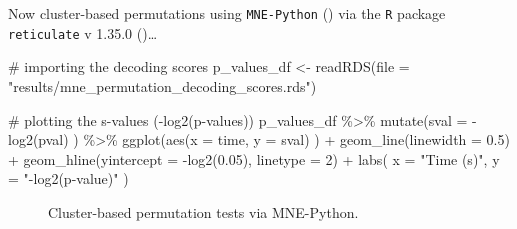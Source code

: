 \documentclass[
  doc,
  floatsintext,
  longtable,
  a4paper,
  nolmodern,
  notxfonts,
  notimes,
  colorlinks=true,linkcolor=blue,citecolor=blue,urlcolor=blue]{apa7}
\newenvironment{Shaded}{\begin{snugshade}}{\end{snugshade}}
\newcommand{\AttributeTok}[1]{\textcolor[rgb]{0.40,0.45,0.13}{#1}}
\newcommand{\CommentTok}[1]{\textcolor[rgb]{0.37,0.37,0.37}{#1}}
\newcommand{\DecValTok}[1]{\textcolor[rgb]{0.68,0.00,0.00}{#1}}
\newcommand{\FloatTok}[1]{\textcolor[rgb]{0.68,0.00,0.00}{#1}}
\newcommand{\FunctionTok}[1]{\textcolor[rgb]{0.28,0.35,0.67}{#1}}
\newcommand{\NormalTok}[1]{\textcolor[rgb]{0.00,0.23,0.31}{#1}}
\newcommand{\OtherTok}[1]{\textcolor[rgb]{0.00,0.23,0.31}{#1}}
\newcommand{\SpecialCharTok}[1]{\textcolor[rgb]{0.37,0.37,0.37}{#1}}
\newcommand{\StringTok}[1]{\textcolor[rgb]{0.13,0.47,0.30}{#1}}
\begin{document}
Now cluster-based permutations using \texttt{MNE-Python}
() via the \texttt{R} package
\texttt{reticulate} v 1.35.0 ()\ldots{}

\begin{Shaded}
\begin{Highlighting}[]
\CommentTok{\# importing the decoding scores}
\NormalTok{p\_values\_df }\OtherTok{\textless{}{-}} \FunctionTok{readRDS}\NormalTok{(}\AttributeTok{file =} \StringTok{"results/mne\_permutation\_decoding\_scores.rds"}\NormalTok{)}

\CommentTok{\# plotting the s{-}values ({-}log2(p{-}values))}
\NormalTok{p\_values\_df }\SpecialCharTok{\%\textgreater{}\%}
    \FunctionTok{mutate}\NormalTok{(}\AttributeTok{sval =} \SpecialCharTok{{-}}\FunctionTok{log2}\NormalTok{(pval) ) }\SpecialCharTok{\%\textgreater{}\%}
    \FunctionTok{ggplot}\NormalTok{(}\FunctionTok{aes}\NormalTok{(}\AttributeTok{x =}\NormalTok{ time, }\AttributeTok{y =}\NormalTok{ sval) ) }\SpecialCharTok{+}
    \FunctionTok{geom\_line}\NormalTok{(}\AttributeTok{linewidth =} \FloatTok{0.5}\NormalTok{) }\SpecialCharTok{+}
    \FunctionTok{geom\_hline}\NormalTok{(}\AttributeTok{yintercept =} \SpecialCharTok{{-}}\FunctionTok{log2}\NormalTok{(}\FloatTok{0.05}\NormalTok{), }\AttributeTok{linetype =} \DecValTok{2}\NormalTok{) }\SpecialCharTok{+}
    \FunctionTok{labs}\NormalTok{(}
        \AttributeTok{x =} \StringTok{"Time (s)"}\NormalTok{,}
        \AttributeTok{y =} \StringTok{"{-}log2(p{-}value)"}
\NormalTok{        )}
\end{Highlighting}
\end{Shaded}

\begin{figure}[!htb]

\caption{\label{fig-mne-cluster}Cluster-based permutation tests via
MNE-Python.}


\end{figure}%
\end{document}
